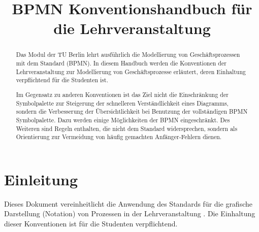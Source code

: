 \documentclass[12pt,report]{../../Templates/snetTeaching}
\title{BPMN Konventionshandbuch für die Lehrveranstaltung \lvname{}}
\date{} %
\begin{document}
\maketitle

\begin{abstract}
\noindent
Das Modul  der TU Berlin lehrt ausführlich die Modellierung von Geschäftsprozessen mit dem Standard  (BPMN). In diesem Handbuch werden die Konventionen der Lehrveranstaltung zur Modellierung von Geschäftsprozesse erläutert, deren Einhaltung verpflichtend für die Studenten ist.

Im Gegensatz zu anderen Konventionen ist das Ziel nicht die Einschränkung der Symbolpalette zur Steigerung der schnelleren Verständlichkeit eines Diagramms, sondern die Verbesserung der Übersichtlichkeit bei Benutzung der vollständigen BPMN Symbolpalette. Dazu werden einige Möglichkeiten der BPMN eingeschränkt. Des Weiteren sind  Regeln enthalten, die nicht dem Standard widersprechen, sondern als Orientierung zur Vermeidung von häufig gemachten Anfänger-Fehlern dienen.



\end{abstract}





\setcounter{secnumdepth}{3}

\tableofcontents

\glsaddall
\printglossary[
	title={Synonyme}
]


\chapter{Einleitung}



Dieses Dokument vereinheitlicht die Anwendung des Standards  für die grafische Darstellung (Notation) von Prozessen in der Lehrveranstaltung . Die Einhaltung dieser Konventionen ist für die Studenten verpflichtend.
\end{document}
